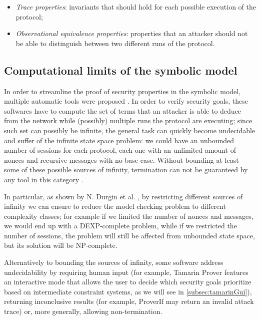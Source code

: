 \documentclass{article}
\begin{document}
\begin{itemize}
    \item \textit{Trace properties}: invariants that should hold for each possible execution of the protocol;
    \item \textit{Observational equivalence properties}: properties that an attacker should not be able to distinguish between two different runs of the protocol.
\end{itemize}

\subsection{Computational limits of the symbolic model}

In order to streamline the proof of security properties in the symbolic model, multiple automatic tools were proposed \cite{SoK}. In order to verify security goals, these softwares have to compute the set of terms that an attacker is able to deduce from the network while (possibly) multiple runs the protocol are executing; since such set can possibly be infinite, the general task can quickly become undecidable and suffer of the infinite state space problem: we could have an unbounded number of sessions for each protocol, each one with an unlimited amount of nonces and recursive messages with no base case. Without bounding at least some of these possible sources of infinity, termination can not be guaranteed by any tool in this category \cite{undecidability}.

In particular, as shown by N. Durgin et al. \cite{ComplexityOfBoundedSecurity}, by restricting different sources of infinity we can ensure to reduce the model checking problem to different complexity classes; for example if we limited the number of nonces and messages, we would end up with a DEXP-complete problem, while if we restricted the number of sessions, the problem will still be affected from unbounded state space, but its solution will be NP-complete.

Alternatively to bounding the sources of infinity, some software address undecidability by requiring human input (for example, Tamarin Prover \cite{tamarinIntroduction} features an interactive mode that allows the user to decide which security goals prioritize based on intermediate constraint systems, as we will see in \ref{subsec:tamarinGui}), returning inconclusive results (for example, ProverIf \cite{proverifIntroduction} may return an invalid attack trace) or, more generally, allowing non-termination.
\end{document}
